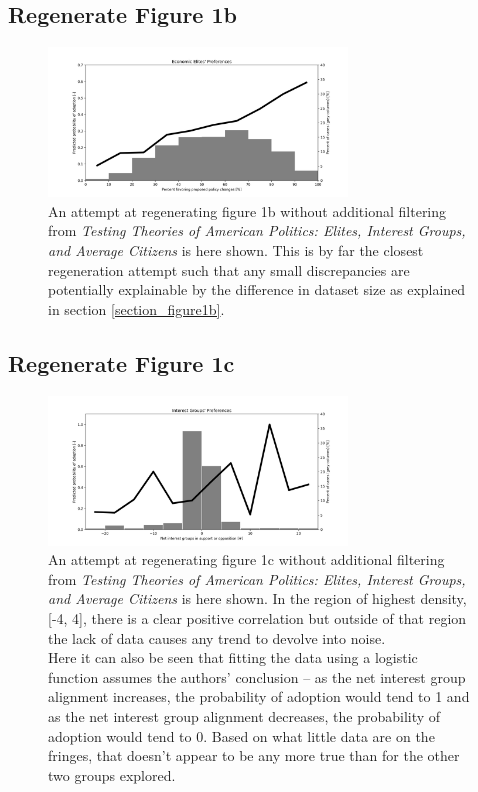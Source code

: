 \documentclass[]{article}
\begin{document}
\subsection{Regenerate Figure 1b}
\begin{figure}[H]
	\begin{center}
		\includegraphics[width=300px]{./figures/generated/economic-elites-preferences.png}
	\end{center}	
	\caption{An attempt at regenerating figure 1b without additional filtering from \textit{Testing Theories of American Politics: Elites, Interest Groups, and Average Citizens} is here shown. This is by far the closest regeneration attempt such that any small discrepancies are potentially explainable by the difference in dataset size as explained in section \ref{section_figure1b}.}
	\label{generated_figure1b}
\end{figure}

\subsection{Regenerate Figure 1c}
\begin{figure}[H]
	\begin{center}
		\includegraphics[width=300px]{./figures/generated/interest-group-preferences.png}
	\end{center}	
	\caption{An attempt at regenerating figure 1c without additional filtering from \textit{Testing Theories of American Politics: Elites, Interest Groups, and Average Citizens} is here shown. In the region of highest density, [-4, 4], there is a clear positive correlation but outside of that region the lack of data causes any trend to devolve into noise. \\Here it can also be seen that fitting the data using a logistic function assumes the authors' conclusion -- as the net interest group alignment increases, the probability of adoption would tend to 1 and as the net interest group alignment decreases, the probability of adoption would tend to 0. Based on what little data are on the fringes, that doesn't appear to be any more true than for the other two groups explored.}
	\label{generated_figure1c}
\end{figure}
\end{document}
